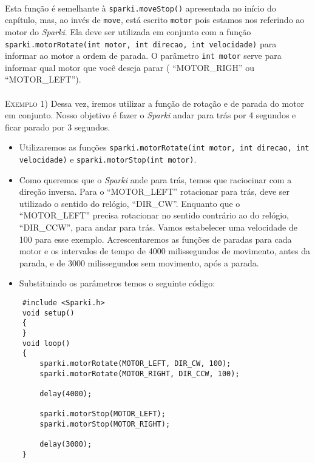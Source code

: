 \paragraph{}
Esta função é semelhante à \texttt{sparki.moveStop()} apresentada no início do capítulo, mas, ao invés de \texttt{move}, está escrito \texttt{motor} pois estamos nos referindo ao motor do \textsl{Sparki}. Ela deve ser utilizada em conjunto com a função \texttt{sparki.motorRotate(int motor, int direcao, int velocidade)} para informar ao motor a ordem de parada. O parâmetro \texttt{int motor} serve para informar qual motor que você deseja parar ( ``MOTOR\_RIGH'' ou ``MOTOR\_LEFT'').
\\~\\
\textsc{Exemplo 1)} Dessa vez, iremos utilizar a função de rotação e de parada do motor em conjunto. Nosso objetivo é fazer o \textsl{Sparki} andar para trás por 4 segundos e ficar parado por 3 segundos.
        
\begin{itemize}
    \item Utilizaremos as funções \texttt{sparki.motorRotate(int motor, int direcao, int velocidade)} e \texttt{sparki.motorStop(int motor)}.
    \item Como queremos que o \textsl{Sparki} ande para trás, temos que raciocinar com a direção inversa. Para o ``MOTOR\_LEFT'' rotacionar para trás, deve ser utilizado o sentido do relógio, ``DIR\_CW''. Enquanto que o ``MOTOR\_LEFT'' precisa rotacionar no sentido contrário ao do relógio, ``DIR\_CCW'', para andar para trás. Vamos estabelecer uma velocidade de 100 para esse exemplo. Acrescentaremos as funções de paradas para cada motor e os intervalos de tempo de 4000 milissegundos de movimento, antes da parada, e de 3000 milissegundos sem movimento, após a parada.
    \item Substituindo os parâmetros temos o seguinte código:
\end{itemize}
    
\begin{verbatim}
    #include <Sparki.h>
    void setup()
    {
    }
    void loop()
    {
        sparki.motorRotate(MOTOR_LEFT, DIR_CW, 100);
        sparki.motorRotate(MOTOR_RIGHT, DIR_CCW, 100);
        
        delay(4000);
        
        sparki.motorStop(MOTOR_LEFT);
        sparki.motorStop(MOTOR_RIGHT);
        
        delay(3000);
    }
\end{verbatim}

